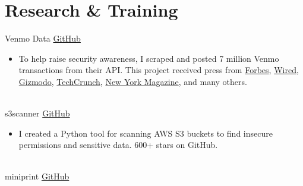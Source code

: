 \documentclass[a4paper]{twentysecondcv} %
\begin{document}
\makeprofile %
 
{\vspace{-2mm}}
\section{Research \& Training}

\begin{twenty}
    
    \twentyitem
    	{\hspace{10mm} \Large \faMoney}
		{}
        {Venmo Data}
        {\href{https://github.com/sa7mon/venmo-data}{GitHub}}
        {\vspace{-2mm}}
        {\begin{itemize}
        \item To help raise security awareness, I scraped and posted 7 million Venmo transactions from their API. This project received press from \href{https://www.forbes.com/sites/kevinmurnane/2019/06/17/venmo-opens-your-transaction-history-to-anyone-who-wants-to-look-heres-how-to-fix-it/}{Forbes}, \href{https://www.wired.com/story/i-scraped-millions-of-venmo-payments-your-data-is-at-risk/}{Wired}, \href{https://gizmodo.com/millions-of-transactions-scraped-in-latest-demonstratio-1835587886}{Gizmodo}, \href{https://techcrunch.com/2019/06/16/millions-venmo-transactions-scraped/}{TechCrunch}, \href{https://nymag.com/intelligencer/2019/06/venmo-payments-should-be-private.html}{New York Magazine}, and many others.
        \end{itemize}}
    \\
    \twentyitem
    	{\hspace{10mm} \Large \faDatabase}
		{}
        {s3scanner}
        {\href{https://github.com/sa7mon/s3scanner}{GitHub}}
        {\vspace{-2mm}}
        {\begin{itemize}
        \item I created a Python tool for scanning AWS S3 buckets to find insecure permissions and sensitive data. 600+ stars on GitHub.
        \end{itemize}}
    \\
    \twentyitem
    	{\hspace{10mm} \Large \faPrint}
		{}
        {miniprint}
        {\href{https://github.com/sa7mon/miniprint}{GitHub}}

\end{twenty}
\end{document}
